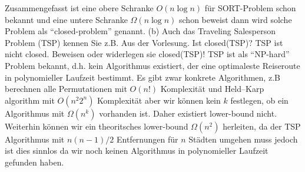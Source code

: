 \documentclass{article}
\begin{document}
\begin{flushleft}
Zusammengefasst ist eine obere Schranke $O(n\log n)$ für SORT-Problem schon bekannt und eine untere Schranke $\Omega(n\log n)$
schon beweist dann wird solche Problem als ``closed-problem” genannt.
\newpage
(b) Auch das Traveling Salesperson Problem (TSP) kennen Sie z.B. Aus der Vorlesung.
\newline
Ist closed(TSP)?
\newline
TSP ist nicht closed.
\newline
Beweisen oder widerlegen sie closed(TSP)!
\newline
TSP ist als ``NP-hard” Problem bekannt, d.h. kein Algorithmus existiert, der eine optimaleste Reiseroute in polynomieller 
Laufzeit bestimmt. Es gibt zwar konkrete Algorithmen, z.B berechnen alle Permutationen mit $O(n!)$ Komplexität und Held–Karp algorithm 
mit $O(n^2 2^n)$ Komplexität aber wir können kein $k$ festlegen, ob ein Algorithmus mit $\Omega(n^k)$ vorhanden ist. Daher 
existiert lower-bound nicht. Weiterhin können wir ein theoritsches lower-bound $\Omega(n^2)$ herleiten, da der TSP Algorithmus mit $n(n-1)/2$ 
Entfernungen für $n$ Städten umgehen muss jedoch ist dies sinnlos da wir noch keinen Algorithmus in polynomieller Laufzeit gefunden haben.
\newline
\end{flushleft}
\end{document}
